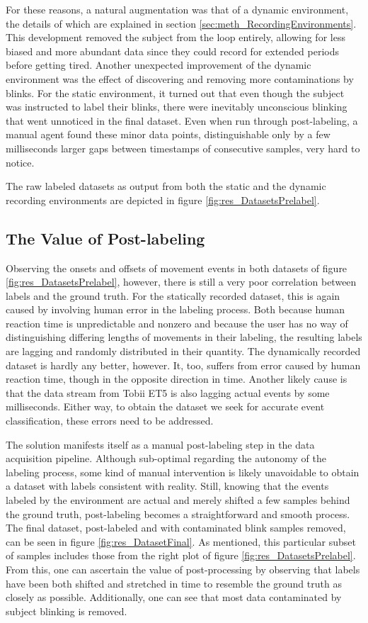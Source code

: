For these reasons, a natural augmentation was that of a dynamic environment, the details of which are explained in section \ref{sec:meth_RecordingEnvironments}. This development removed the subject from the loop entirely, allowing for less biased and more abundant data since they could record for extended periods before getting tired. Another unexpected improvement of the dynamic environment was the effect of discovering and removing more contaminations by blinks. For the static environment, it turned out that even though the subject was instructed to label their blinks, there were inevitably unconscious blinking that went unnoticed in the final dataset. Even when run through post-labeling, a manual agent found these minor data points, distinguishable only by a few milliseconds larger gaps between timestamps of consecutive samples, very hard to notice. 

The raw labeled datasets as output from both the static and the dynamic recording environments are depicted in figure \ref{fig:res_DatasetsPrelabel}.

\newpage
\subsection{The Value of Post-labeling}

Observing the onsets and offsets of movement events in both datasets of figure \ref{fig:res_DatasetsPrelabel}, however, there is still a very poor correlation between labels and the ground truth. For the statically recorded dataset, this is again caused by involving human error in the labeling process. Both because human reaction time is unpredictable and nonzero and because the user has no way of distinguishing differing lengths of movements in their labeling, the resulting labels are lagging and randomly distributed in their quantity. The dynamically recorded dataset is hardly any better, however. It, too, suffers from error caused by human reaction time, though in the opposite direction in time. Another likely cause is that the data stream from Tobii ET5 is also lagging actual events by some milliseconds. Either way, to obtain the dataset we seek for accurate event classification, these errors need to be addressed.

The solution manifests itself as a manual post-labeling step in the data acquisition pipeline. Although sub-optimal regarding the autonomy of the labeling process, some kind of manual intervention is likely unavoidable to obtain a dataset with labels consistent with reality. Still, knowing that the events labeled by the environment are actual and merely shifted a few samples behind the ground truth, post-labeling becomes a straightforward and smooth process. The final dataset, post-labeled and with contaminated blink samples removed, can be seen in figure \ref{fig:res_DatasetFinal}. As mentioned, this particular subset of samples includes those from the right plot of figure \ref{fig:res_DatasetsPrelabel}. From this, one can ascertain the value of post-processing by observing that labels have been both shifted and stretched in time to resemble the ground truth as closely as possible. Additionally, one can see that most data contaminated by subject blinking is removed.

